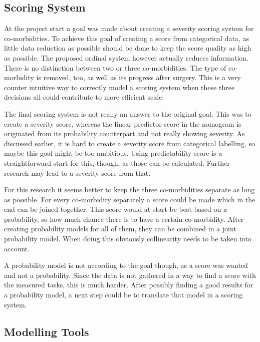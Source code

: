 \documentclass[10pt,a4paper]{article}
\begin{document}
	\subsection{Scoring System}
	
	At the project start a goal was made about creating a severity scoring system for co-morbidities. To achieve this goal of creating a score from categorical data, as little data reduction as possible should be done to keep the score quality as high as possible. The proposed ordinal system however actually reduces information. There is no distinction between two or three co-morbidities. The type of co-morbidity is removed, too, as well as its progress after surgery. This is a very counter intuitive way to correctly model a scoring system when these three decisions all could contribute to more efficient scale.
	
	The final scoring system is not really an answer to the original goal. This was to create a severity score, whereas the linear predictor score in the nomogram is originated from its probability counterpart and not really showing severity. As discussed earlier, it is hard to create a severity score from categorical labelling, so maybe this goal might be too ambitious. Using predictability score is a straightforward start for this, though, as those can be calculated. Further research may lead to a severity score from that. 
	
	For this research it seems better to keep the three co-morbidities separate as long as possible. For every co-morbidity separately a score could be made which in the end can be joined together. This score would at start be best based on a probability, so how much chance there is to have a certain co-morbidity. After creating probability models for all of them, they can be combined in a joint probability model. When doing this obviously collinearity needs to be taken into account. 
	
	A probability model is not according to the goal though, as a score was wanted and not a probability. Since the data is not gathered in a way to find a score with the measured tasks, this is much harder. After possibly finding a good results for a probability model, a next step could be to translate that model in a scoring system.
	
	\subsection{Modelling Tools}
\end{document}
